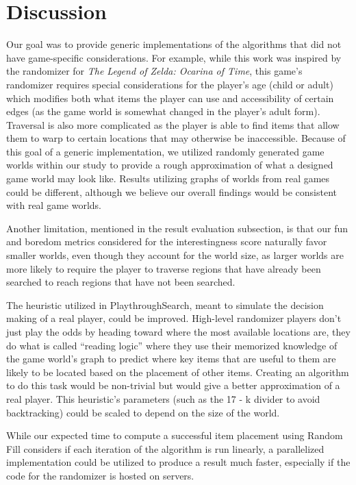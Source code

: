 \documentclass{ieeeaccess}
\begin{document}
\section{Discussion}
Our goal was to provide generic implementations of the algorithms that did not have
game-specific considerations. For example, while this work was inspired by the randomizer for
\textit{The Legend of Zelda: Ocarina of Time}, this game’s randomizer requires special
considerations for the player’s age (child or adult) which modifies both what items the player
can use and accessibility of certain edges (as the game world is somewhat changed in the
player’s adult form). Traversal is also more complicated as the player is able to find items
that allow them to warp to certain locations that may otherwise be inaccessible. Because of
this goal of a generic implementation, we utilized randomly generated game worlds within our
study to provide a rough approximation of what a designed game world may look like. Results
utilizing graphs of worlds from real games could be different, although we believe our overall
findings would be consistent with real game worlds.

Another limitation, mentioned in the result evaluation subsection, is that our fun and boredom
metrics considered for the interestingness score naturally favor smaller worlds, even though
they account for the world size, as larger worlds are more likely to require the player to
traverse regions that have already been searched to reach regions that have not been searched.

The heuristic utilized in PlaythroughSearch, meant to simulate the decision making of a real
player, could be improved. High-level randomizer players don’t just play the odds by heading
toward where the most available locations are, they do what is called “reading logic” where
they use their memorized knowledge of the game world’s graph to predict where key items that
are useful to them are likely to be located based on the placement of other items. Creating an
algorithm to do this task would be non-trivial but would give a better approximation of a real
player. This heuristic's parameters (such as the 17 - k divider to avoid backtracking) could 
be scaled to depend on the size of the world.

While our expected time to compute a successful item placement using Random Fill considers if
each iteration of the algorithm is run linearly, a parallelized implementation could be
utilized to produce a result much faster, especially if the code for the randomizer is hosted
on servers.
\end{document}
